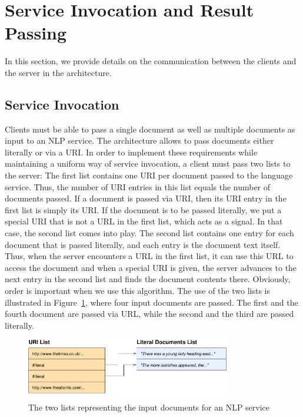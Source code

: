 \section{Service Invocation and Result Passing}
In this section, we provide details on the communication between the
clients and the server in the \sa architecture.

\subsection{Service Invocation}
\label{sec:invoc}
Clients must be able to pass a single document as well as multiple
documents as input to an NLP service. The \sa architecture allows to
pass documents either literally or via a URI. In order to implement
these requirements while maintaining a uniform way of service
invocation, a client must pass two lists to the server: The first list
contains one URI per document passed to the language service.  Thus,
the number of URI entries in this list equals the number of documents
passed. If a document is passed via URI, then its URI entry in the
first list is simply its URI. If the document is to be passed
literally, we put a special URI that is not a URL in the first list,
which acts as a signal. In that case, the second list comes into
play. The second list contains one entry for each document that is
passed literally, and each entry is the document text itself. Thus,
when the server encounters a URL in the first list, it can use this
URL to access the document and when a special URI is given, the server
advances to the next entry in the second list and finds the document
contents there. Obviously, order is important when we use this
algorithm. The use of the two lists is illustrated in
Figure~\ref{fig:twolists}, where four input documents are passed. The
first and the fourth document are passed via URL, while the second and
the third are passed literally.

\begin{figure}
  \centering
  \includegraphics[width=0.8\textwidth]{pictures/twolists}
  \vspace*{-0.4cm}
  \caption{The two lists representing the input documents for an NLP service}  
  \label{fig:twolists}
\end{figure}

